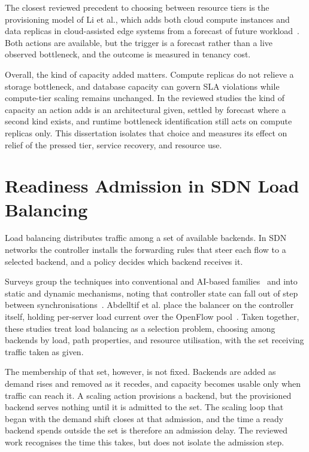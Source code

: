 ﻿\documentclass[12pt,reqno,twoside]{amsbook}
\begin{document}
The closest reviewed precedent to choosing between resource tiers is the
provisioning model of Li et al., which adds both cloud compute instances and data
replicas in cloud-assisted edge systems from a forecast of future
workload~\parencite{Li2020HeterogeneityAwareElasticProvisioningCloud}. Both
actions are available, but the trigger is a forecast rather than a live observed
bottleneck, and the outcome is measured in tenancy cost.

Overall, the kind of capacity added matters. Compute replicas do not relieve a
storage bottleneck, and database capacity can govern SLA violations while
compute-tier scaling remains unchanged. In the reviewed studies the kind of
capacity an action adds is an architectural given, settled by forecast where a
second kind exists, and runtime bottleneck identification still acts on compute
replicas only. This dissertation isolates that choice and measures its effect on
relief of the pressed tier, service recovery, and resource use.


\section{Readiness Admission in SDN Load Balancing}\label{sec:lit_sdn_lb} %
Load balancing distributes traffic among a set of available backends. In SDN
networks the controller installs the forwarding rules that steer each flow to a
selected backend, and a policy decides which backend receives it.

Surveys group the techniques into conventional and AI-based
families~\parencite{Belgaum2020SystematicReviewLoadBalancingTechniques} and into
static and dynamic mechanisms, noting that controller state can fall out of step
between synchronisations~\parencite{Neghabi2018LoadBalancingMechanismsSoftwareDefined}.
Abdelltif et al. place the balancer on the controller itself, holding per-server
load current over the OpenFlow
pool~\parencite{Abdelltif2018SDNLoadBalancingServiceCloud}. Taken together, these
studies treat load balancing as a selection problem, choosing among backends by
load, path properties, and resource utilisation, with the set receiving traffic
taken as given.

The membership of that set, however, is not fixed. Backends are added as demand
rises and removed as it recedes, and capacity becomes usable only when traffic can
reach it. A scaling action provisions a backend, but the provisioned backend
serves nothing until it is admitted to the set. The scaling loop that began with
the demand shift closes at that admission, and the time a ready backend spends
outside the set is therefore an admission delay. The reviewed work recognises the
time this takes, but does not isolate the admission step.
\end{document}

